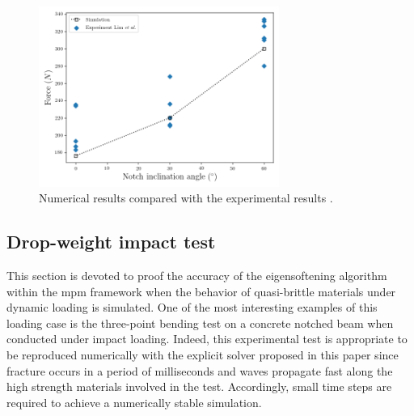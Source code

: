 \documentclass[preprint,12pt,a4paper]{elsarticle}
\begin{document}
\begin{figure}
  \centering
  \includegraphics[width=0.7\textwidth]{./Figure-Angle-Forces-test}
  \caption{Numerical results compared with the experimental results \cite{LIM_1993}.}
  \label{fig:plot-Angle-Forces-test}
\end{figure}


\subsection{Drop-weight impact test}
\label{sec:3.3}
This section is devoted to proof
the accuracy of the eigensoftening algorithm within the \acrshort{mpm} framework when the behavior of quasi-brittle materials under dynamic loading is simulated. One of the most interesting examples of this loading case is the three-point bending test on a concrete notched beam when conducted under impact loading. Indeed, this experimental test is appropriate to be reproduced numerically with the explicit solver proposed in this paper since fracture occurs in a period of milliseconds and waves propagate fast along the high strength materials involved in the test. Accordingly, small time steps are required to achieve a numerically stable simulation.\\
\end{document}
